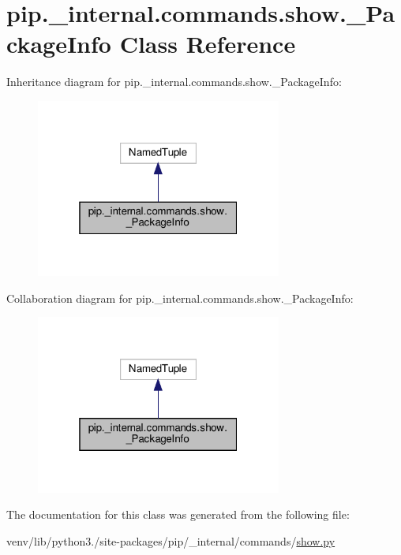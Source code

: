 \hypertarget{classpip_1_1__internal_1_1commands_1_1show_1_1__PackageInfo}{}\section{pip.\+\_\+internal.\+commands.\+show.\+\_\+\+Package\+Info Class Reference}
\label{classpip_1_1__internal_1_1commands_1_1show_1_1__PackageInfo}


Inheritance diagram for pip.\+\_\+internal.\+commands.\+show.\+\_\+\+Package\+Info\+:
\nopagebreak
\begin{figure}[H]
\begin{center}
\leavevmode
\includegraphics[width=229pt]{classpip_1_1__internal_1_1commands_1_1show_1_1__PackageInfo__inherit__graph}
\end{center}
\end{figure}


Collaboration diagram for pip.\+\_\+internal.\+commands.\+show.\+\_\+\+Package\+Info\+:
\nopagebreak
\begin{figure}[H]
\begin{center}
\leavevmode
\includegraphics[width=229pt]{classpip_1_1__internal_1_1commands_1_1show_1_1__PackageInfo__coll__graph}
\end{center}
\end{figure}


The documentation for this class was generated from the following file\+:\begin{DoxyCompactItemize}
\item 
venv/lib/python3./site-\/packages/pip/\+\_\+internal/commands/\hyperlink{show_8py}{show.\+py}\end{DoxyCompactItemize}
